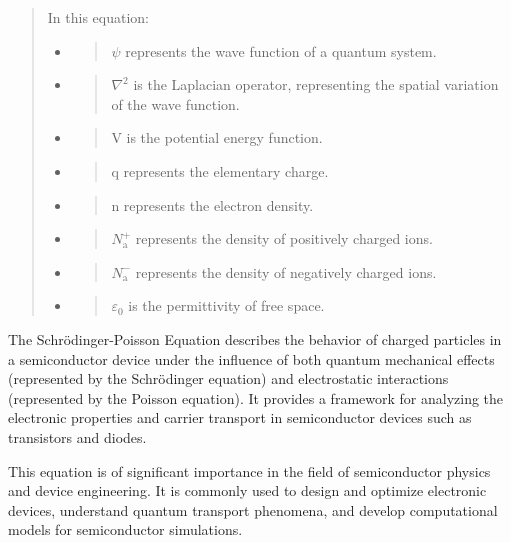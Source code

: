\documentclass{article}
\begin{document}
\begin{quote}
    
In this equation:

\begin{itemize}
\item
  \begin{quote}
  $\psi$ represents the wave function of a quantum system.
  \end{quote}
\item
  \begin{quote}
  $\nabla^2$ is the Laplacian operator, representing the spatial variation of
  the wave function.
  \end{quote}
\item
  \begin{quote}
  V is the potential energy function.
  \end{quote}
\item
  \begin{quote}
  q represents the elementary charge.
  \end{quote}
\item
  \begin{quote}
  n represents the electron density.
  \end{quote}
\item
  \begin{quote}
  $N_\text{a}^+$ represents the density of positively charged ions.
  \end{quote}
\item
  \begin{quote}
  $N_\text{a}^-$ represents the density of negatively charged ions.
  \end{quote}
\item
  \begin{quote}
  $\varepsilon_0$ is the permittivity of free space.
  \end{quote}
\end{itemize}

\end{quote}
The Schrödinger-Poisson Equation\cite{lange1995overview} describes the behavior of charged particles in a semiconductor device under the influence of both quantum mechanical effects (represented by the Schrödinger equation) and electrostatic interactions (represented by the Poisson equation). It provides a framework for analyzing the electronic properties and carrier transport in semiconductor devices such as transistors and diodes.

This equation is of significant importance in the field of semiconductor physics\cite{pierret1996semiconductor} and device engineering. It is commonly used to design and optimize electronic devices, understand quantum transport phenomena, and develop computational models for semiconductor simulations.
\end{document}
